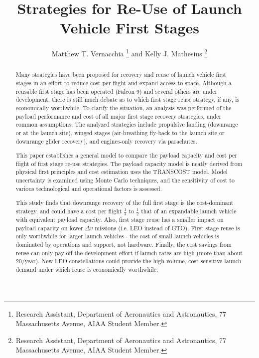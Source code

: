 \documentclass[conf]{new-aiaa}
\title{Strategies for Re-Use of Launch Vehicle First Stages}
\author{Matthew T. Vernacchia \footnote{Research Assistant, Department of Aeronautics and Astronautics, 77 Massachusetts Avenue, AIAA Student Member.}
and Kelly J. Mathesius  \footnote{Research Assistant, Department of Aeronautics and Astronautics, 77 Massachusetts Avenue, AIAA Student Member.}}
\affil{Massachusetts Institute of Technology, Cambridge, MA, 02139}
\begin{document}
\maketitle

\begin{abstract}
Many strategies have been proposed for recovery and reuse of launch vehicle first stages in an effort to reduce cost per flight and expand access to space. Although a reusable first stage has been operated (Falcon 9) and several others are under development, there is still much debate as to which first stage reuse strategy, if any, is economically worthwhile. To clarify the situation, an analysis was performed of the payload performance and cost of all major first stage recovery strategies, under common assumptions. The analyzed strategies include propulsive landing (downrange or at the launch site), winged stages (air-breathing fly-back to the launch site or downrange glider recovery), and engines-only recovery via parachutes.

This paper establishes a general model to compare the payload capacity and cost per flight of first stage re-use strategies. The payload capacity model is neatly derived from physical first principles and cost estimation uses the TRANSCOST model. Model uncertainty is examined using Monte Carlo techniques, and the sensitivity of cost to various technological and operational factors is assessed.

This study finds that downrange recovery of the full first stage is the cost-dominant strategy, and could have a cost per flight $\frac{1}{3}$ to $\frac{1}{2}$ that of an expandable launch vehicle with equivalent payload capacity. Also, first stage reuse has a smaller impact on payload capacity on lower $\Delta v$ missions (i.e. LEO instead of GTO).  First stage reuse is only worthwhile for larger launch vehicles - the cost of small launch vehicles is dominated by operations and support, not hardware. Finally, the cost savings from reuse can only pay off the development effort if launch rates are high (more than about 20/year). New LEO constellations could provide the high-volume, cost-sensitive launch demand under which reuse is economically worthwhile.
\end{abstract}
\end{document}
